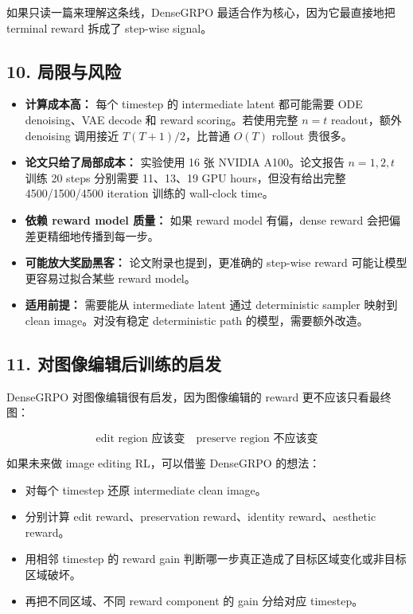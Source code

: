如果只读一篇来理解这条线，DenseGRPO 最适合作为核心，因为它最直接地把 terminal reward 拆成了 step-wise signal。

\subsection{10. 局限与风险}

\begin{itemize}[leftmargin=1.5em]
  \item \textbf{计算成本高：} 每个 timestep 的 intermediate latent 都可能需要 ODE denoising、VAE decode 和 reward scoring。若使用完整 \(n=t\) readout，额外 denoising 调用接近 \(T(T+1)/2\)，比普通 \(O(T)\) rollout 贵很多。
  \item \textbf{论文只给了局部成本：} 实验使用 16 张 NVIDIA A100。论文报告 \(n=1,2,t\) 训练 20 steps 分别需要 11、13、19 GPU hours，但没有给出完整 4500/1500/4500 iteration 训练的 wall-clock time。
  \item \textbf{依赖 reward model 质量：} 如果 reward model 有偏，dense reward 会把偏差更精细地传播到每一步。
  \item \textbf{可能放大奖励黑客：} 论文附录也提到，更准确的 step-wise reward 可能让模型更容易过拟合某些 reward model。
  \item \textbf{适用前提：} 需要能从 intermediate latent 通过 deterministic sampler 映射到 clean image。对没有稳定 deterministic path 的模型，需要额外改造。
\end{itemize}

\subsection{11. 对图像编辑后训练的启发}

DenseGRPO 对图像编辑很有启发，因为图像编辑的 reward 更不应该只看最终图：

\[
\text{edit region 应该变}
\quad
\text{preserve region 不应该变}
\]

如果未来做 image editing RL，可以借鉴 DenseGRPO 的想法：

\begin{itemize}[leftmargin=1.5em]
  \item 对每个 timestep 还原 intermediate clean image。
  \item 分别计算 edit reward、preservation reward、identity reward、aesthetic reward。
  \item 用相邻 timestep 的 reward gain 判断哪一步真正造成了目标区域变化或非目标区域破坏。
  \item 再把不同区域、不同 reward component 的 gain 分给对应 timestep。
\end{itemize}

